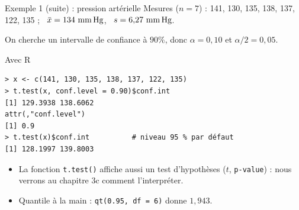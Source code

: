 \documentclass{BeamerTemplate}
\begin{document}
\begin{frame}[t]{Exemple 1 (suite) : pression artérielle}
  Mesures ($n=7$) : 141, 130, 135, 138, 137, 122, 135 ; \ $\bar{x} = 134\text{ mm\,Hg}$, \ $s = 6{,}27\text{ mm\,Hg}$.

  On cherche un intervalle de confiance à \alert{$90\%$}, donc $\alpha = 0{,}10$ et $\alpha/2 = 0{,}05$.

  \medskip

  \medskip
\end{frame}

\begin{frame}[fragile,t]{Avec R}
  \small
\begin{verbatim}
> x <- c(141, 130, 135, 138, 137, 122, 135)
> t.test(x, conf.level = 0.90)$conf.int
[1] 129.3938 138.6062
attr(,"conf.level")
[1] 0.9
> t.test(x)$conf.int          # niveau 95 % par défaut
[1] 128.1997 139.8003
\end{verbatim}

  \normalsize
  \begin{itemize}\itemsep 2mm
    \item La fonction \texttt{t.test()} affiche aussi un \alert{test d'hypothèses} ($t$, \texttt{p-value}) : nous verrons au chapitre 3c comment l'interpréter.
    \item Quantile à la main : \texttt{qt(0.95, df = 6)} donne $1{,}943$.
  \end{itemize}
\end{frame}

\end{document}
